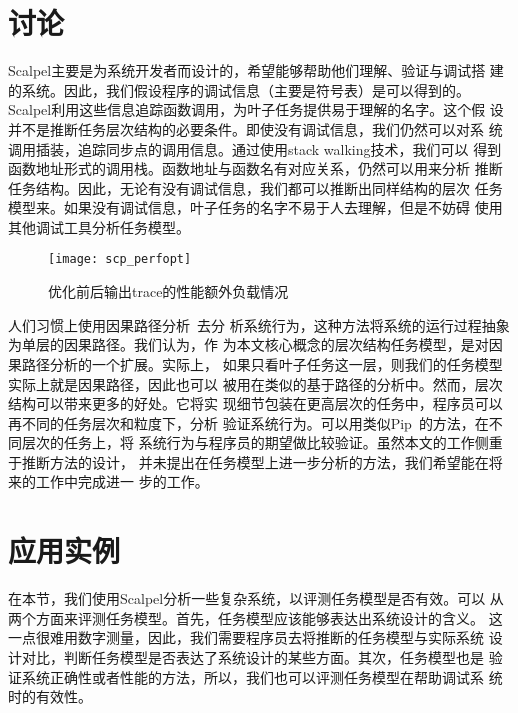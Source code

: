 \section{讨论}
\label{sec:scp:discussion}

Scalpel主要是为系统开发者而设计的，希望能够帮助他们理解、验证与调试搭
建的系统。因此，我们假设程序的调试信息（主要是符号表）是可以得到的。
Scalpel利用这些信息追踪函数调用，为叶子任务提供易于理解的名字。这个假
设并不是推断任务层次结构的必要条件。即使没有调试信息，我们仍然可以对系
统调用插装，追踪同步点的调用信息。通过使用stack walking技术，我们可以
得到函数地址形式的调用栈。函数地址与函数名有对应关系，仍然可以用来分析
推断任务结构。因此，无论有没有调试信息，我们都可以推断出同样结构的层次
任务模型来。如果没有调试信息，叶子任务的名字不易于人去理解，但是不妨碍
使用其他调试工具分析任务模型。

\begin{figure}
  \centering
  \begin{minipage}{0.8\linewidth}
    \centering
    \texttt{[image: scp\_perfopt]}
    \caption{优化前后输出trace的性能额外负载情况}
    \label{fig:scpperf_opt}
  \end{minipage}
\end{figure}

人们习惯上使用因果路径分析~\cite{pinpoint, project5, pip, magpie}去分
析系统行为，这种方法将系统的运行过程抽象为单层的因果路径。我们认为，作
为本文核心概念的层次结构任务模型，是对因果路径分析的一个扩展。实际上，
如果只看叶子任务这一层，则我们的任务模型实际上就是因果路径，因此也可以
被用在类似的基于路径的分析中。然而，层次结构可以带来更多的好处。它将实
现细节包装在更高层次的任务中，程序员可以再不同的任务层次和粒度下，分析
验证系统行为。可以用类似Pip~\cite{pip}的方法，在不同层次的任务上，将
系统行为与程序员的期望做比较验证。虽然本文的工作侧重于推断方法的设计，
并未提出在任务模型上进一步分析的方法，我们希望能在将来的工作中完成进一
步的工作。


\section{应用实例}
\label{sec:scp:case}

在本节，我们使用Scalpel分析一些复杂系统，以评测任务模型是否有效。可以
从两个方面来评测任务模型。首先，任务模型应该能够表达出系统设计的含义。
这一点很难用数字测量，因此，我们需要程序员去将推断的任务模型与实际系统
设计对比，判断任务模型是否表达了系统设计的某些方面。其次，任务模型也是
验证系统正确性或者性能的方法，所以，我们也可以评测任务模型在帮助调试系
统时的有效性。

